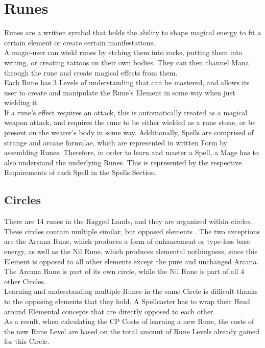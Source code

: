 \chapter*{Runes}\label{ch:runes}

Runes are a written symbol that holds the ability to shape magical energy to fit a certain element or create certain manifestations.\\
A magic-user can wield runes by etching them into rocks, putting them into writing, or creating tattoos on their own bodies.
They can then channel Mana through the rune and create magical effects from them.\\
Each Rune has 3 Levels of understanding that can be mastered, and allows its user to create and manipulate the Rune's Element in some way when just wielding it.\\
If a rune's effect requires an attack, this is automatically treated as a magical weapon attack, and requires the rune to be either wielded as a rune stone, or be present on the wearer's body in some way.
Additionally, Spells are comprised of strange and arcane formulae, which are represented in written Form by assembling Runes.
Therefore, in order to learn and master a Spell, a Mage has to also understand the underlying Runes.
This is represented by the respective Requirements of each Spell in the Spells Section.

\section{Circles}\label{sec:arcaneCircles}
There are 14 runes in the Ragged Lands, and they are organized within circles.
These circles contain multiple similar, but opposed elements .
The two exceptions are the Arcana Rune, which produces a form of enhancement or type-less base energy, as well as the Nil Rune, which produces elemental nothingness, since this Element is opposed to all other elements except the pure and unchanged Arcana.
The Arcana Rune is part of its own circle, while the Nil Rune is part of all 4 other Circles.\\

Learning and understanding multiple Runes in the same Circle is difficult thanks to the opposing elements that they hold.
A Spellcaster has to wrap their Head around Elemental concepts that are directly opposed to each other.\\

As a result, when calculating the CP Costs of learning a new Rune, the costs of the new Rune Level are based on the total amount of Rune Levels already gained for this Circle.\\

